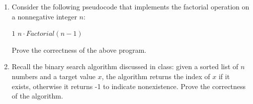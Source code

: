 \documentclass{article}
\begin{document}
\begin{enumerate}
\item Consider the following pseudocode that implements the factorial operation on a nonnegative integer $n$:
\begin{algorithmic}
    \State \Return $1$
  \Else
    \State \Return $n \cdot Factorial(n - 1)$
  \EndIf
\EndFunction
\end{algorithmic}
Prove the correctness of the above program.

\item Recall the binary search algorithm discussed in class: given a sorted list of $n$ numbers and a target value $x$, the algorithm returns the index of $x$ if it exists, otherwise it returns -1 to indicate nonexistence. Prove the correctness of the algorithm.

\end{enumerate}
\end{document}
